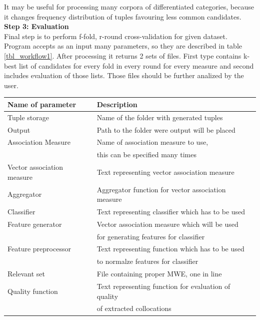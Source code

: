 It may be useful for processing many corpora of differentiated categories, because it changes frequency distribution of tuples 
favouring less common candidates.
\\ \textbf{Step 3: Evaluation}\\
Final step is to perform f-fold, r-round cross-validation for given dataset. Program accepts as an input many parameters, 
so they are described in table \ref{tbl_workflow1}. After processing it returns 2 sets of files. First type contains k-best list 
of candidates for every fold in every round for every measure and second includes evaluation of those lists. 
Those files should be further analized by the user. 

\begin{table}[t]
    \centering
    \begin{tabular*}{0.9\textwidth}{|l @{\extracolsep{\fill}} l|}
        \hline 
        \textbf{Name of parameter} & \textbf{Description} \\
        \hline
        Tuple storage & Name of the folder with generated tuples \\
        \hline
        Output & Path to the folder were output will be placed \\
        \hline
        Association Measure & Name of association measure to use, \\& this can be specified many times \\
        \hline
        Vector association measure & Text representing vector association measure \\
        \hline
        Aggregator & Aggregator function for vector association measure \\
        \hline
        Classifier & Text representing classifier which has to be used \\
        \hline
        Feature generator & Vector association measure which will be used \\& for generating features for classifier \\
        \hline
        Feature preprocessor & Text representing function which has to be used \\& to normalze features for classifier \\
        \hline
        Relevant set & File containing proper MWE, one in line \\
        \hline
        Quality function & Text representing function for evaluation of quality \\& of extracted collocations \\

\end{tabular*}
\end{table}
